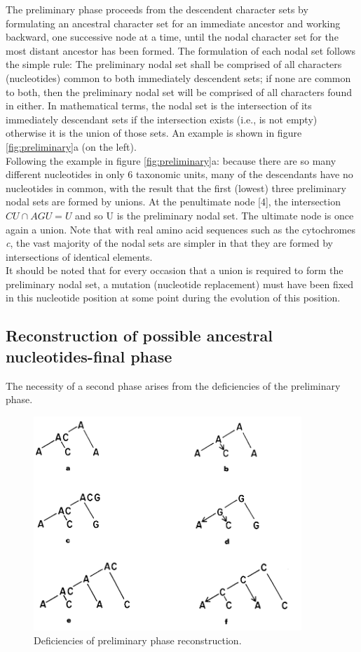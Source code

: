 The preliminary phase proceeds from the descendent character sets by formulating an ancestral character set for an immediate ancestor and working backward, one successive node at a time, until the nodal character set for the most distant ancestor has been formed.
The formulation of each nodal set follows the simple rule: The preliminary nodal set shall be comprised of all characters (nucleotides) common to both immediately descendent sets; if none are common to both, then the preliminary nodal set will be comprised of all characters found in either.
In mathematical terms, the nodal set is the intersection of its immediately descendant sets if the intersection exists (i.e., is not empty) otherwise it is the union of those sets. An example is shown in figure \ref{fig:preliminary}a (on the left).
\\
Following the example in figure \ref{fig:preliminary}a: because there are so many different nucleotides in only 6 taxonomic units, many of the descendants have no nucleotides in common, with the result that the first (lowest) three preliminary nodal sets are formed by unions. At the penultimate node [4], the intersection $CU \cap AGU = U$ and so U is the preliminary nodal set. The ultimate node is once again a union. Note that with real amino acid sequences such as the cytochromes \textit{c}, the vast majority of the nodal sets are simpler in that they are formed by intersections of identical elements.
\\
It should be noted that for every occasion that a union is required to form the preliminary nodal set, a mutation (nucleotide replacement) must have been fixed in this nucleotide position at some point during the evolution of this position.

\subsection{Reconstruction of possible ancestral nucleotides-final phase}
The necessity of a second phase arises from the deficiencies of the preliminary phase.

\begin{figure}[H]
		\centering
		\includegraphics[width=0.9\textwidth]{3.png}
		\caption{Deficiencies of preliminary phase reconstruction. }
		\label{fig:deficiencies}
	\end{figure}

